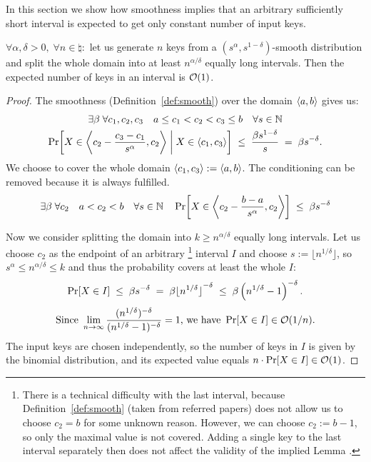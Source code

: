 
In this section we show how smoothness implies that an arbitrary sufficiently short interval is expected to get only constant number of input keys.

\begin{lem*}%
	$\forall \alpha,\delta > 0, \;
	 \forall n \in \natural:
	$ let us generate $n$ keys from a $(s^\alpha,s^{1-\delta})$-smooth distribution and split the whole domain into at least $n^{\alpha / \delta}$ equally long intervals.
	Then the expected number of keys in an interval is $\mathcal O(1)$.

\begin{proof}

The smoothness (Definition~\ref{def:smooth}) over the domain $\left\langle a,b\right\rangle$ gives us:
\begin{multline*}
	\exists\beta \; \forall c_1,c_2,c_3 \quad a \le c_1 < c_2 < c_3 \le b \quad \forall s \in \mathbb{N} \\
		\Pr\!\left[  X \in \left\langle c_2 - \frac{c_3-c_1}{s^\alpha} ,c_2\right\rangle \; \middle| \; X \in \left\langle c_1,c_3\right\rangle  \right]
		\;\le\; \frac{\beta s^{1-\delta}}{s}  \;=\;  \beta s^{-\delta}.
\end{multline*}
We choose to cover the whole domain $\left\langle c_1,c_3\right\rangle := \left\langle a,b\right\rangle$. The conditioning can be removed because it is always fulfilled.
\[
	\exists\beta \; \forall c_2 \quad a < c_2 < b \quad \forall s \in \mathbb{N} \quad
		\Pr\!\left[  X \in \left\langle c_2 - \frac{b-a}{s^\alpha} ,c_2\right\rangle  \right]
		\;\le\; \beta s^{-\delta}
\]

Now we consider splitting the domain into $k \ge n^{\alpha / \delta}$ equally long intervals.
Let us choose $c_2$ as the endpoint of an arbitrary%
	\footnote{There is a technical difficulty with the last interval, because Definition~\ref{def:smooth} (taken from referred papers) does not allow us to choose $c_2 = b$ for some unknown reason.
	However, we can choose $c_2 := b-1$, so only the maximal value is not covered. Adding a single key to the last interval separately then does not affect the validity of the implied Lemma%
	.
	}
interval $I$ and choose $s:= \lfloor n^{1 / \delta} \rfloor$, so
$ s^\alpha \le n^{\alpha / \delta} \le k $ and thus the probability covers at least the whole $I$:
\[	\Pr\!\left[X \in I\right] \;\le\; \beta s^{-\delta}
	\;=\; \beta {\lfloor n^{1 / \delta} \rfloor}^{-\delta}
	\;\le\; \beta \left( n^{1 / \delta} - 1 \right) ^{-\delta}.
\] \[
\text{Since } \lim_{n \to \infty}
	\frac{ ( n^{1 / \delta} ) ^{-\delta} }{ ( n^{1 / \delta} - 1 ) ^{-\delta} }
	= 1 \text{, we have } \Pr\!\left[X \in I\right] \in \mathcal O(1/n).
\]
%
The input keys are chosen independently, so the number of keys in $I$ is given by the binomial distribution, and its expected value equals
$ n \cdot \Pr\!\left[X \in I\right] \in \mathcal O(1)$.

\end{proof}
\end{lem*}

